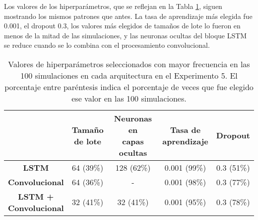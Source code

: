 \documentclass[../../main.tex]{subfiles}
\begin{document}
Los valores de los hiperparámetros, que se reflejan en la Tabla
\ref{tab:hyperparams_exp5}, siguen mostrando los mismos patrones que antes. La tasa de
aprendizaje más elegida fue 0.001, el dropout 0.3, los valores más elegidos de tamaños de
lote lo fueron en menos de la mitad de las simulaciones, y las neuronas ocultas del bloque
LSTM se reduce cuando se lo combina con el procesamiento convolucional.

\begin{table}[H]
    \centering
    \renewcommand{\arraystretch}{1.2}
    \begin{tabular}{|c|c|c|c|c|}
        \hline
            & \makecell{\textbf{Tamaño}\\\textbf{de lote}}
            & \makecell{\textbf{Neuronas en}\\\textbf{capas ocultas}}
            & \makecell{\textbf{Tasa de}\\\textbf{aprendizaje}}
            & \textbf{Dropout} \\ \hline\hline
        \textbf{LSTM}
            & 64 (39\%) & 128 (62\%) & 0.001 (99\%) & 0.3 (51\%) \\ \hline
        \textbf{Convolucional}
            & 64 (36\%) & -          & 0.001 (98\%) & 0.3 (77\%) \\ \hline
        \makecell{\textbf{LSTM +}\\\textbf{Convolucional}}
            & 32 (41\%) & 32 (41\%)  & 0.001 (95\%) & 0.3 (78\%) \\
        \hline
    \end{tabular}
    \caption{Valores de hiperparámetros seleccionados con mayor frecuencia en las 100
    simulaciones en cada arquitectura en el Experimento 5. El porcentaje entre paréntesis indica el porcentaje
    de veces que fue elegido ese valor en las 100 simulaciones.}
    \label{tab:hyperparams_exp5}
\end{table}
\end{document}
